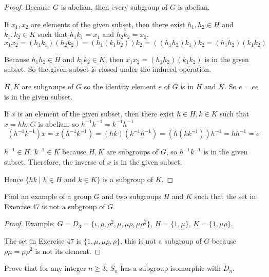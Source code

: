 \begin{proof}
    Because $G$ is abelian, then every subgroup of $G$ is abelian.

    If $x_{1}, x_{2}$ are elements of the given subset, then there exist $h_{1}, h_{2}\in H$ and $k_{1}, k_{2}\in K$ such that $h_{1}k_{1} = x_{1}$ and $h_{2}k_{2} = x_{2}$.
    \[
        x_{1}x_{2} = (h_{1}k_{1})(h_{2}k_{2}) = (h_{1}(k_{1}h_{2}))k_{2} = ((h_{1}h_{2})k_{1})k_{2} = (h_{1}h_{2})(k_{1}k_{2})
    \]

    Because $h_{1}h_{2}\in H$ and $k_{1}k_{2}\in K$, then $x_{1}x_{2} = (h_{1}h_{2})(k_{1}k_{2})$ is in the given subset. So the given subset is closed under the induced operation.

    $H, K$ are subgroups of $G$ so the identity element $e$ of $G$ is in $H$ and $K$. So $e = ee$ is in the given subset.

    If $x$ is an element of the given subset, then there exist $h\in H, k\in K$ such that $x = hk$. $G$ is abelian, so $h^{-1}k^{-1} = k^{-1}h^{-1}$
    \[
        (h^{-1}k^{-1})x = x(h^{-1}k^{-1}) = (hk)(k^{-1}h^{-1}) = (h(kk^{-1}))h^{-1} = hh^{-1} = e
    \]

    $h^{-1}\in H$, $k^{-1}\in K$ because $H, K$ are subgroups of $G$, so $h^{-1}k^{-1}$ is in the given subset. Therefore, the inverse of $x$ is in the given subset.

    Hence $\{ hk \mid h\in H \text{ and } k\in K \}$ is a subgroup of $K$.
\end{proof}

\newpage
\begin{exercise}
    Find an example of a group $G$ and two subgroups $H$ and $K$ such that the set in Exercise 47 is not a subgroup of $G$.
\end{exercise}

\begin{proof}
    Example: $G = D_{3} = \{ \iota, \rho, \rho^{2}, \mu, \mu\rho, \mu\rho^{2} \}$, $H = \{ 1, \mu \}$, $K = \{ 1, \mu\rho \}$.

    The set in Exercise 47 is $\{ 1, \mu, \mu\rho, \rho \}$, this is not a subgroup of $G$ because $\rho\mu = \mu\rho^{2}$ is not its element.
\end{proof}

\newpage
\begin{exercise}
    Prove that for any integer $n\geq 3$, $S_{n}$ has a subgroup isomorphic with $D_{n}$.
\end{exercise}

